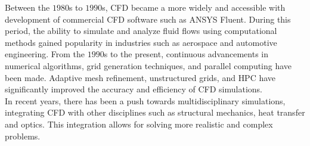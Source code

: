         Between the $1980$s to $1990$s, \gls{CFD} became a more widely and accessible
        with development of commercial \gls{CFD} software such as ANSYS Fluent.
        During this period, the ability to simulate and analyze fluid flows
        using computational methods gained popularity in industries such as
        aerospace and automotive engineering. From the $1990$s to the present,
        continuous advancements in numerical
        algorithms, grid generation techniques, and parallel computing have been
        made. Adaptive mesh refinement, unstructured grids, and
        \gls{HPC} have significantly improved the
        accuracy and efficiency of \gls{CFD} simulations.\\

        In recent years, there has been a push towards multidisciplinary simulations,
        integrating \gls{CFD} with other disciplines such as structural
        mechanics, heat transfer and optics. This integration allows for solving
        more realistic and complex problems.
